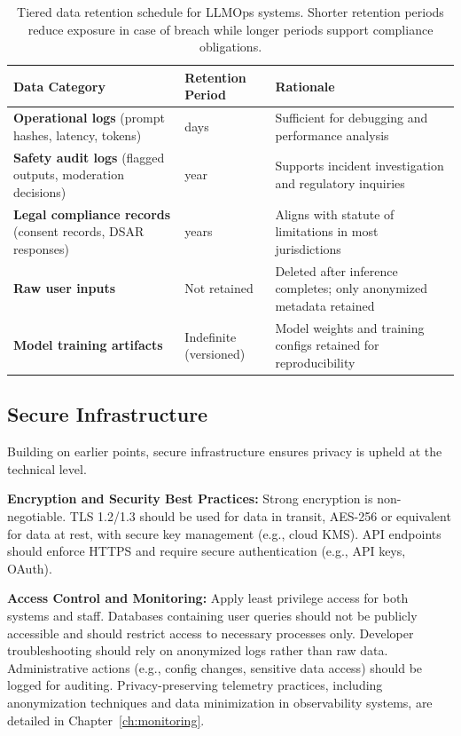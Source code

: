 \begin{table}[t]
\centering
\small
\caption{Tiered data retention schedule for LLMOps systems. Shorter retention periods reduce exposure in case of breach while longer periods support compliance obligations.}
\label{tab:ch11_retention}
\setlength{\tabcolsep}{6pt}
\renewcommand{\arraystretch}{1.3}
\begin{tabularx}{\linewidth}{@{}>{\raggedright\arraybackslash}p{2.8cm}>{\raggedright\arraybackslash}p{2.2cm}>{\raggedright\arraybackslash}X@{}}
\toprule
\rowcolor{gray!15}
\textbf{Data Category} & \textbf{Retention Period} & \textbf{Rationale} \\
\midrule
\textbf{Operational logs} (prompt hashes, latency, tokens) & 30 days & Sufficient for debugging and performance analysis \\
\addlinespace[2pt]
\textbf{Safety audit logs} (flagged outputs, moderation decisions) & 1 year & Supports incident investigation and regulatory inquiries \\
\addlinespace[2pt]
\textbf{Legal compliance records} (consent records, DSAR responses) & 7 years & Aligns with statute of limitations in most jurisdictions \\
\addlinespace[2pt]
\textbf{Raw user inputs} & Not retained & Deleted after inference completes; only anonymized metadata retained \\
\addlinespace[2pt]
\textbf{Model training artifacts} & Indefinite (versioned) & Model weights and training configs retained for reproducibility \\
\bottomrule
\end{tabularx}
\end{table}

\subsection{Secure Infrastructure}

Building on earlier points, secure infrastructure ensures privacy is upheld at the technical level.

\textbf{Encryption and Security Best Practices:} Strong encryption is non-negotiable. TLS 1.2/1.3 should be used for data in transit, AES-256 or equivalent for data at rest, with secure key management (e.g., cloud KMS). API endpoints should enforce HTTPS and require secure authentication (e.g., API keys, OAuth).

\textbf{Access Control and Monitoring:} Apply least privilege access for both systems and staff. Databases containing user queries should not be publicly accessible and should restrict access to necessary processes only. Developer troubleshooting should rely on anonymized logs rather than raw data. Administrative actions (e.g., config changes, sensitive data access) should be logged for auditing. Privacy-preserving telemetry practices, including anonymization techniques and data minimization in observability systems, are detailed in Chapter~\ref{ch:monitoring}.

